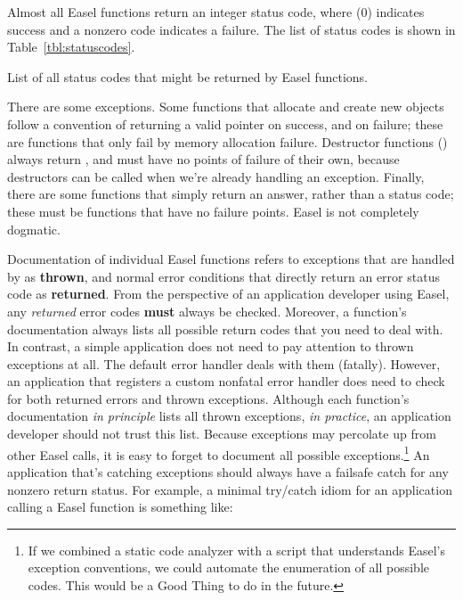 Almost all Easel functions return an integer status code, where
 (0) indicates success and a nonzero code indicates a
failure. The list of status codes is shown in
Table~\ref{tbl:statuscodes}.

\begin{table}
\begin{center}

\end{center}
\caption{List of all status codes that might be returned by Easel functions.}
\label{tbl:statuscodes}
\end{table}

There are some exceptions. Some  functions that
allocate and create new objects follow a convention of returning a
valid pointer on success, and  on failure; these are
functions that only fail by memory allocation failure. Destructor
functions () always return , and must
have no points of failure of their own, because destructors can be
called when we're already handling an exception. Finally, there are
some functions that simply return an answer, rather than a status
code; these must be functions that have no failure points. Easel is
not completely dogmatic.

Documentation of individual Easel functions refers to exceptions that
are handled by  as \textbf{thrown}, and normal
error conditions that directly return an error status code as
\textbf{returned}.  From the perspective of an application developer
using Easel, any \emph{returned} error codes \textbf{must} always be
checked. Moreover, a function's documentation always lists all
possible return codes that you need to deal with.  In contrast, a
simple application does not need to pay attention to thrown exceptions
at all. The default error handler deals with them (fatally). However,
an application that registers a custom nonfatal error handler does
need to check for both returned errors and thrown exceptions. Although
each function's documentation \emph{in principle} lists all thrown
exceptions, \emph{in practice}, an application developer should not
trust this list. Because exceptions may percolate up from other Easel
calls, it is easy to forget to document all possible
exceptions.\footnote{If we combined a static code analyzer with a
script that understands Easel's exception conventions, we could
automate the enumeration of all possible codes. This would be a Good
Thing to do in the future.} An application that's catching exceptions
should always have a failsafe catch for any nonzero return status. For
example, a minimal try/catch idiom for an application calling a Easel
function is something like:

